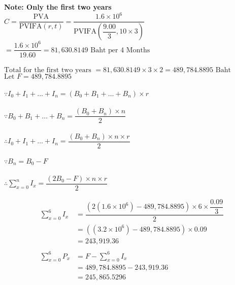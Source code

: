 \documentclass{article}
\begin{document}
\begin{outline}[enumerate]
	\2 \textbf{Note: Only the first two years }\\
		$ C = \dfrac{\mbox{PVA}}{\mbox{PVIFA}(r, t)} = \dfrac{1.6 \times 10^6}{\mbox{PVIFA}\left(\dfrac{9.00}{3}, 10 \times 3 \right)} $
		$ 	= \dfrac{1.6 \times 10^6}{19.60} =  81,630.8149 \mbox{ Baht per 4 Months}$\\\\
		$\mbox{Total for the first two years } = 81,630.8149 \times 3 \times 2 = 489,784.8895 \mbox{ Baht} $
		$\mbox{Let } F = 489,784.8895$ \\\\
        $ \because I_0 + I_1 + \dots + I_n = (B_0 + B_1 + \dots + B_n) \times r$ \\\\
        $ \because B_0 + B_1 + \dots + B_n = \dfrac{(B_0 + B_n) \times n}{2} $ \\\\
        $ \therefore I_0 + I_1 + \dots + I_n = \dfrac{(B_0 + B_n) \times n \times r}{2} $ \\\\
        $ \because B_n = B_0 - F $ \\\\
        $ \therefore \sum_{x = 0}^{n} I_x =\dfrac{(2B_0 - F) \times n \times r}{2} $ 


\begin{align*}
         \sum_{x = 0}^{6} I_x &= \dfrac{(2(1.6 \times 10^6) - 489,784.8895) \times 6 \times \dfrac{0.09}{3}}{2} \\
        &= ((3.2 \times 10^6) - 489,784.8895) \times 0.09 \\
        &= 243,919.36 \\\\
        \sum_{x = 0}^{6} P_x &= F - \sum_{x = 0}^{6} I_x \\
        &= 489,784.8895 - 243,919.36 \\
        &= 245,865.5296
\end{align*}


		
		
		
\end{outline}
\end{document}
